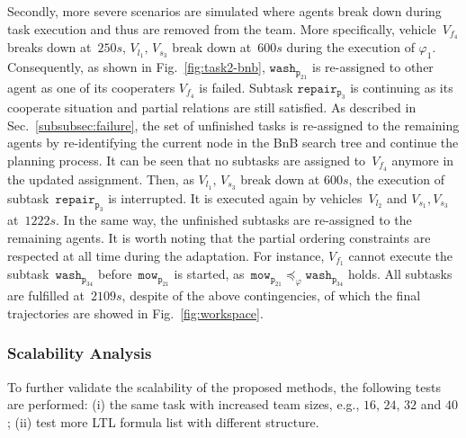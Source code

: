 Secondly, more severe scenarios are simulated where agents break down
during task execution and thus are removed from the team.
More specifically, vehicle~$V_{f_4}$ breaks down at~$250s$, $V_{l_1},\, V_{s_3}$ break
down at~$600s$ during the execution of $\varphi_1$.
Consequently, as shown in Fig.~\ref{fig:task2-bnb}, $\texttt{wash}_{\texttt{p}_{21}}$
is re-assigned to other agent as one of its cooperaters $V_{f_4}$ is failed. Subtask
$\texttt{repai}$$\texttt{r}_{\texttt{p}_{3}}$ is continuing as its cooperate situation and partial relations
are still satisfied. As described in Sec.~\ref{subsubsec:failure},
the set of unfinished tasks is re-assigned to the remaining agents by re-identifying
the current node in the BnB search tree and continue the planning process.
It can be seen that no subtasks are assigned to~$V_{f_4}$ anymore in the updated assignment.
Then, as $V_{l_1},\, V_{s_3}$ break down at $600s$, the execution of subtask~$\texttt{repair}_{\texttt{p}_{3}}$
is interrupted. It is executed again by vehicles~$V_{l_2}$ and $V_{s_1},V_{s_3}$ at~$1222s$.
In the same way, the unfinished subtasks are re-assigned to the remaining agents.
It is worth noting that the partial ordering constraints are respected at all
time during the adaptation.
For instance, $V_{f_1}$ cannot execute the subtask~$\texttt{wash}_{\texttt{p}_{34}}$
before~$\texttt{mow}_{\texttt{p}_{21}}$ is started,
as~$\texttt{mow}_{\texttt{p}_{21}}\preceq_\varphi\texttt{wash}_{\texttt{p}_{34}}  $ holds.
All subtasks are fulfilled at~$2109s$, despite of the above contingencies,
of which the final trajectories are showed in Fig.~\ref{fig:workspace}.



\subsubsection{Scalability Analysis}\label{subsubsec:scalable}
To further validate the scalability of the proposed methods,
the following tests are performed:
(i) the same task with increased team sizes,
e.g., $16$, $24$, $32$ and $40$;
(ii) test more LTL formula list with different structure.

